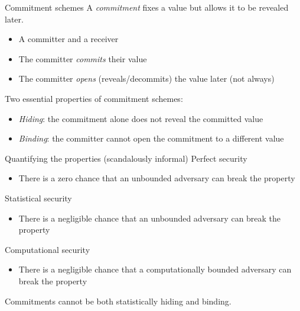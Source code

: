 \begin{frame}{Commitment schemes}
  A \emph{commitment} fixes a value but allows it to be revealed later.
  \begin{itemize}[<+(1)->]
    \item A committer and a receiver
    \item The committer \emph{commits} their value
    \item The committer \emph{opens} (reveals/decommits) the value later (not always)
  \end{itemize}

  \vspace*{1em}

  \pause
  Two essential properties of commitment schemes:
  \begin{itemize}[<+(1)->]
    \item \emph{Hiding}: the commitment alone does not reveal the committed value
    \item \emph{Binding}: the committer cannot open the commitment to a different value
  \end{itemize}
\end{frame}

\begin{frame}{Quantifying the properties (scandalously informal)}
  Perfect security
  \begin{itemize}
    \item There is a zero chance that an unbounded adversary can break the property
  \end{itemize}

  \pause
  Statistical security
  \begin{itemize}
    \item There is a negligible chance that an unbounded adversary can break the property
  \end{itemize}

  \pause
  Computational security
  \begin{itemize}
    \item There is a negligible chance that a computationally bounded adversary can break the property
  \end{itemize}

  \pause
  Commitments cannot be both statistically hiding and binding.
\end{frame}


